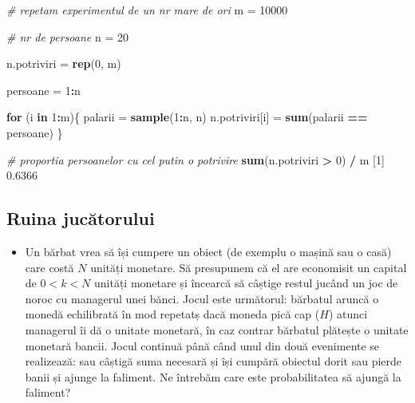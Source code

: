 \documentclass[]{article}
\newenvironment{Shaded}{\begin{snugshade}}{\end{snugshade}}
\newcommand{\CommentTok}[1]{\textcolor[rgb]{0.56,0.35,0.01}{\textit{#1}}}
\newcommand{\ControlFlowTok}[1]{\textcolor[rgb]{0.13,0.29,0.53}{\textbf{#1}}}
\newcommand{\DecValTok}[1]{\textcolor[rgb]{0.00,0.00,0.81}{#1}}
\newcommand{\FloatTok}[1]{\textcolor[rgb]{0.00,0.00,0.81}{#1}}
\newcommand{\KeywordTok}[1]{\textcolor[rgb]{0.13,0.29,0.53}{\textbf{#1}}}
\newcommand{\NormalTok}[1]{#1}
\newcommand{\OperatorTok}[1]{\textcolor[rgb]{0.81,0.36,0.00}{\textbf{#1}}}
\newcommand{\StringTok}[1]{\textcolor[rgb]{0.31,0.60,0.02}{#1}}
\newenvironment{frshaded*}{%
  \def\FrameCommand{\fboxrule=\FrameRule\fboxsep=\FrameSep \fcolorbox{framecolor}{shadecolor1}}%
  \MakeFramed {\advance\hsize-\width \FrameRestore}}%
{\endMakeFramed}
\newenvironment{rmdblock}[1]
  {\begin{frshaded*}
  \begin{itemize}
  \renewcommand{\labelitemi}{
    \raisebox{-.7\height}[0pt][0pt]{
      {\setkeys{Gin}{width=2em,keepaspectratio}\texttt{[image: images/icons/\#1]}}
    }
  }
  \item
  }
  {
  \end{itemize}
  \end{frshaded*}
  }
\newenvironment{rmdexercise}
  {\begin{rmdblock}{exercise}}
  {\end{rmdblock}}
\begin{document}
\begin{Shaded}
\begin{Highlighting}[]
\CommentTok{# repetam experimentul de un nr mare de ori}
\NormalTok{m =}\StringTok{ }\DecValTok{10000}

\CommentTok{# nr de persoane }
\NormalTok{n =}\StringTok{ }\DecValTok{20}

\NormalTok{n.potriviri =}\StringTok{ }\KeywordTok{rep}\NormalTok{(}\DecValTok{0}\NormalTok{, m)}

\NormalTok{persoane =}\StringTok{ }\DecValTok{1}\OperatorTok{:}\NormalTok{n}

\ControlFlowTok{for}\NormalTok{ (i }\ControlFlowTok{in} \DecValTok{1}\OperatorTok{:}\NormalTok{m)\{}
\NormalTok{  palarii =}\StringTok{ }\KeywordTok{sample}\NormalTok{(}\DecValTok{1}\OperatorTok{:}\NormalTok{n, n)}
\NormalTok{  n.potriviri[i] =}\StringTok{ }\KeywordTok{sum}\NormalTok{(palarii }\OperatorTok{==}\StringTok{ }\NormalTok{persoane)}
\NormalTok{\}}

\CommentTok{# proportia persoanelor cu cel putin o potrivire }
\KeywordTok{sum}\NormalTok{(n.potriviri }\OperatorTok{>}\StringTok{ }\DecValTok{0}\NormalTok{) }\OperatorTok{/}\StringTok{ }\NormalTok{m}
\NormalTok{[}\DecValTok{1}\NormalTok{] }\FloatTok{0.6366}
\end{Highlighting}
\end{Shaded}

\hypertarget{ruina-jucux103torului}{%
\subsection{Ruina jucătorului}\label{ruina-jucux103torului}}

\begin{rmdexercise}
Un bărbat vrea să își cumpere un obiect (de exemplu o mașină sau o casă)
care costă \(N\) unități monetare. Să presupunem că el are economisit un
capital de \(0 < k < N\) unități monetare și încearcă să câștige restul
jucând un joc de noroc cu managerul unei bănci. Jocul este următorul:
bărbatul aruncă o monedă echilibrată în mod repetatș dacă moneda pică
cap (\(H\)) atunci managerul îi dă o unitate monetară, în caz contrar
bărbatul plătește o unitate monetară bancii. Jocul continuă până când
unul din două evenimente se realizează: sau câștigă suma necesară și își
cumpără obiectul dorit sau pierde banii și ajunge la faliment. Ne
întrebăm care este probabilitatea să ajungă la faliment?
\end{rmdexercise}
\end{document}
